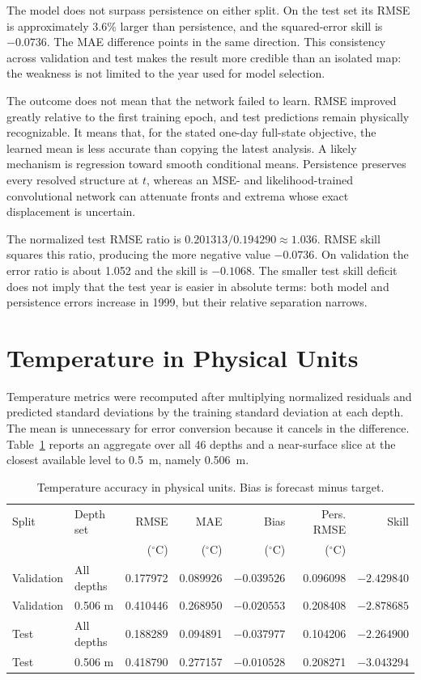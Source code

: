 The model does not surpass persistence on either split. On the test set its RMSE is approximately 3.6\% larger than persistence, and the squared-error skill is $-0.0736$. The MAE difference points in the same direction. This consistency across validation and test makes the result more credible than an isolated map: the weakness is not limited to the year used for model selection.

The outcome does not mean that the network failed to learn. RMSE improved greatly relative to the first training epoch, and test predictions remain physically recognizable. It means that, for the stated one-day full-state objective, the learned mean is less accurate than copying the latest analysis. A likely mechanism is regression toward smooth conditional means. Persistence preserves every resolved structure at $t$, whereas an MSE- and likelihood-trained convolutional network can attenuate fronts and extrema whose exact displacement is uncertain.

The normalized test RMSE ratio is $0.201313/0.194290\approx1.036$. RMSE skill squares this ratio, producing the more negative value $-0.0736$. On validation the error ratio is about 1.052 and the skill is $-0.1068$. The smaller test skill deficit does not imply that the test year is easier in absolute terms: both model and persistence errors increase in 1999, but their relative separation narrows.

\section{Temperature in Physical Units}

Temperature metrics were recomputed after multiplying normalized residuals and predicted standard deviations by the training standard deviation at each depth. The mean is unnecessary for error conversion because it cancels in the difference. Table~\ref{tab:temperature-results} reports an aggregate over all 46 depths and a near-surface slice at the closest available level to 0.5~m, namely 0.506~m.

\begin{table}[htbp]
\centering
\small
\caption{Temperature accuracy in physical units. Bias is forecast minus target.}
\label{tab:temperature-results}
\begin{tabular}{llrrrrr}
\toprule
Split & Depth set & RMSE & MAE & Bias & Pers. RMSE & Skill \\
 & & ($^{\circ}$C) & ($^{\circ}$C) & ($^{\circ}$C) & ($^{\circ}$C) & \\
\midrule
Validation & All depths & 0.177972 & 0.089926 & $-0.039526$ & 0.096098 & $-2.429840$ \\
Validation & 0.506 m & 0.410446 & 0.268950 & $-0.020553$ & 0.208408 & $-2.878685$ \\
Test & All depths & 0.188289 & 0.094891 & $-0.037977$ & 0.104206 & $-2.264900$ \\
Test & 0.506 m & 0.418790 & 0.277157 & $-0.010528$ & 0.208271 & $-3.043294$ \\
\bottomrule
\end{tabular}
\end{table}

